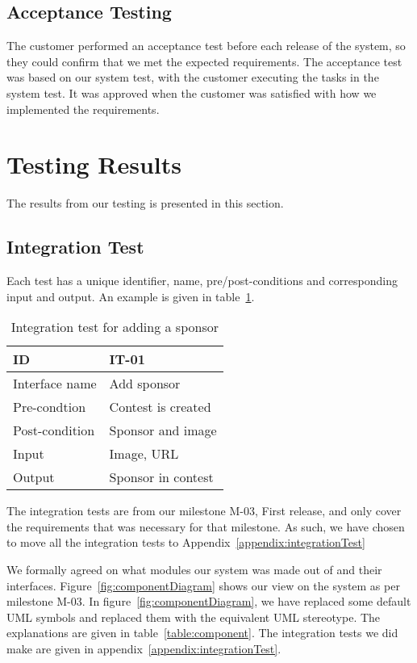 \subsection{Acceptance Testing}
The customer performed an acceptance test before each release of the
system, so they could confirm that we met the expected requirements.
The acceptance test was based on our system test, with the customer
executing the tasks in the system test. It was
approved when the customer was satisfied with how we implemented the
requirements.

\pagebreak
\section{Testing Results}
The results from our testing is presented in this section.

\subsection{Integration Test}
Each test has a unique identifier, name, pre/post-conditions and corresponding
input and output. An example is given in table~\ref{table:integrationTest}.

\begin{longtable}{|l|l|}
    \caption{Integration test for adding a sponsor} \label{table:integrationTest}\\
\hline
ID & IT-01\\\hline
Interface name & Add sponsor\\\hline
Pre-condtion & Contest is created\\\hline
Post-condition & Sponsor and image\\\hline
Input & Image, URL\\\hline
Output & Sponsor in contest\\\hline
\end{longtable}

The integration tests are from our milestone M-03, First release, and only cover the
requirements that was necessary for that milestone. As such, we have
chosen to move all the integration tests to Appendix~\ref{appendix:integrationTest}

We formally agreed on what modules our system was made out of and their
interfaces. Figure~\ref{fig:componentDiagram} shows our view on the system as
per milestone M-03. In figure~\ref{fig:componentDiagram}, we have replaced
some default UML symbols and replaced them with the equivalent UML stereotype.
The explanations are given in table~\ref{table:component}. The integration
tests we did make are given in appendix~\ref{appendix:integrationTest}.

